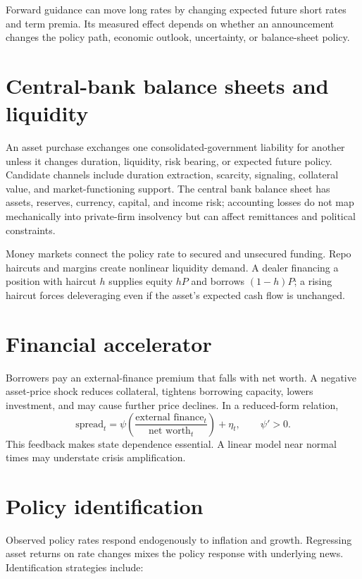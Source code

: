 Forward guidance can move long rates by changing expected future short rates and
term premia. Its measured effect depends on whether an announcement changes the
policy path, economic outlook, uncertainty, or balance-sheet policy.

\section{Central-bank balance sheets and liquidity}

An asset purchase exchanges one consolidated-government liability for another unless
it changes duration, liquidity, risk bearing, or expected future policy. Candidate
channels include duration extraction, scarcity, signaling, collateral value, and
market-functioning support. The central bank balance sheet has assets, reserves,
currency, capital, and income risk; accounting losses do not map mechanically into
private-firm insolvency but can affect remittances and political constraints.

Money markets connect the policy rate to secured and unsecured funding. Repo haircuts
and margins create nonlinear liquidity demand. A dealer financing a position with
haircut $h$ supplies equity $hP$ and borrows $(1-h)P$; a rising haircut forces
deleveraging even if the asset's expected cash flow is unchanged.

\section{Financial accelerator}

Borrowers pay an external-finance premium that falls with net worth. A negative
asset-price shock reduces collateral, tightens borrowing capacity, lowers investment,
and may cause further price declines. In a reduced-form relation,
\[
\text{spread}_t=\psi
\left(\frac{\text{external finance}_t}{\text{net worth}_t}\right)+\eta_t,
\qquad \psi'>0.
\]
This feedback makes state dependence essential. A linear model near normal times may
understate crisis amplification.

\section{Policy identification}

Observed policy rates respond endogenously to inflation and growth. Regressing asset
returns on rate changes mixes the policy response with underlying news. Identification
strategies include:

